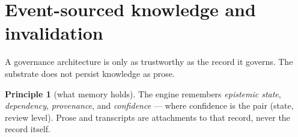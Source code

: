 \documentclass[11pt]{amsart}
\theoremstyle{definition}
\newtheorem{principle}{Principle}
\theoremstyle{remark}
\begin{document}
\section{Event-sourced knowledge and invalidation}\label{sec:substrate}

A governance architecture is only as trustworthy as the record it governs. The
substrate does not persist knowledge as prose.

\begin{principle}[what memory holds]\label{pr:memory}
The engine remembers \emph{epistemic state}, \emph{dependency},
\emph{provenance}, and \emph{confidence} --- where confidence is the pair
(state, review level). Prose and transcripts are attachments to that record,
never the record itself.
\end{principle}
\end{document}
